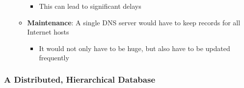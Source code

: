 \documentclass[11pt]{article}
\providecommand{\tightlist}{%
      \setlength{\itemsep}{0pt}\setlength{\parskip}{0pt}}
\begin{document}
\begin{itemize}
\begin{itemize}
    \begin{itemize}
    \tightlist
    \item
      This can lead to significant delays
    \end{itemize}
  \item
    \textbf{Maintenance}: A single DNS server would have to keep records
    for all Internet hosts

    \begin{itemize}
    \tightlist
    \item
      It would not only have to be huge, but also have to be updated
      frequently
    \end{itemize}
  \end{itemize}
\end{itemize}

    \subsubsection{A Distributed, Hierarchical
Database}\label{a-distributed-hierarchical-database}
\end{document}
